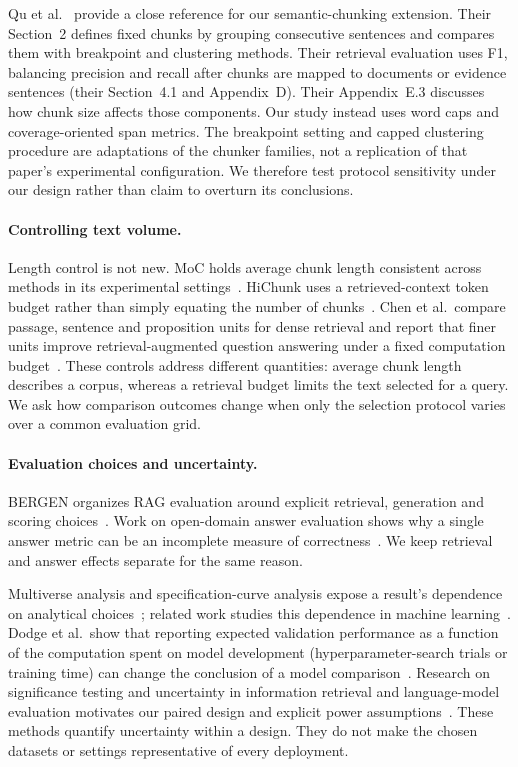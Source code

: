 \documentclass[11pt]{article}
\begin{document}
Qu et al.~\cite{qu2025semanticchunking} provide a close reference for our semantic-chunking extension. Their Section~2 defines fixed chunks by grouping consecutive sentences and compares them with breakpoint and clustering methods. Their retrieval evaluation uses F1, balancing precision and recall after chunks are mapped to documents or evidence sentences (their Section~4.1 and Appendix~D). Their Appendix~E.3 discusses how chunk size affects those components. Our study instead uses word caps and coverage-oriented span metrics. The breakpoint setting and capped clustering procedure are adaptations of the chunker families, not a replication of that paper's experimental configuration. We therefore test protocol sensitivity under our design rather than claim to overturn its conclusions.

\paragraph{Controlling text volume.}
Length control is not new. MoC holds average chunk length consistent across methods in its experimental settings~\cite{moc2025}. HiChunk uses a retrieved-context token budget rather than simply equating the number of chunks~\cite{hichunk2025}. Chen et al.\ compare passage, sentence and proposition units for dense retrieval and report that finer units improve retrieval-augmented question answering under a fixed computation budget~\cite{chen2024densex}. These controls address different quantities: average chunk length describes a corpus, whereas a retrieval budget limits the text selected for a query. We ask how comparison outcomes change when only the selection protocol varies over a common evaluation grid.

\paragraph{Evaluation choices and uncertainty.}
BERGEN organizes RAG evaluation around explicit retrieval, generation and scoring choices~\cite{rau2024bergen}. Work on open-domain answer evaluation shows why a single answer metric can be an incomplete measure of correctness~\cite{kamalloo2023evaluating}. We keep retrieval and answer effects separate for the same reason.

Multiverse analysis and specification-curve analysis expose a result's dependence on analytical choices~\cite{steegen2016multiverse,simonsohn2020speccurve}; related work studies this dependence in machine learning~\cite{bell2022multiverse}. Dodge et al.\ show that reporting expected validation performance as a function of the computation spent on model development (hyperparameter-search trials or training time) can change the conclusion of a model comparison~\cite{dodge2019showyourwork}. Research on significance testing and uncertainty in information retrieval and language-model evaluation motivates our paired design and explicit power assumptions~\cite{smucker2007sigtests,urbano2019sigtesting,miller2024errorbars}. These methods quantify uncertainty within a design. They do not make the chosen datasets or settings representative of every deployment.
\end{document}
